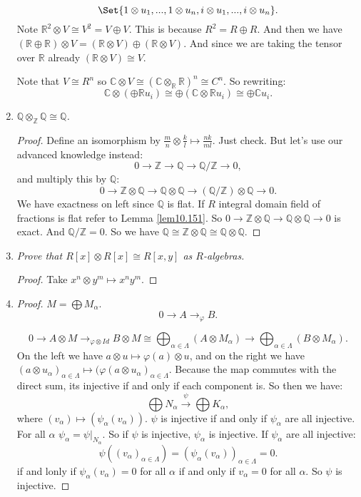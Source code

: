 \documentclass[9pt,reqno,twoside]{amsbook}
\theoremstyle{plain}
\numberwithin{section}{chapter}
\numberwithin{equation}{chapter}
\theoremstyle{definition}
\theoremstyle{remark}
\theoremstyle{plain}
\newcommand{\R}{\mathbb{R}}
\newcommand{\z}{\mathbb{Z}}
\newcommand{\Q}{\mathbb{Q}}
\renewcommand{\c}{\mathbb{C}}
\newcommand{\fracc}{\frac}
\newcommand{\tens}{\otimes}
\renewcommand{\phi}{\varphi}
\begin{document}
\begin{enumerate}[label=\arabic*.]
$$
\Set{1 \tens u_1,...,1 \tens u_n,i \tens u_1,...,i \tens u_n}.
$$ 
Note $\R^2 \tens V \cong V^2 = V \oplus V$. This is because $R^2 = R \oplus R$. And then we have $(\R \oplus \R) \tens V = (\R \tens V) \oplus (\R \tens V)$. And since we are taking the tensor over $\R$ already $(\R \tens V) \cong V$.  

Note that $V \cong R^n$ so $\c \tens V \cong (\c \tens_\R \R)^n \cong C^n$. So rewriting:
$$
\c \tens(\oplus\R u_i) \cong \oplus(\c \tens \R u_i) \cong \oplus \c u_i.
$$



\setcounter{enumi}{13}
\item \textit{$\Q \tens_\z \Q \cong \Q$. }

\begin{proof}
Define an isomorphism by $\fracc{m}{n} \tens \fracc{k}{l} \mapsto \fracc{nk}{ml}$. Just check. But let's use our advanced knowledge instead:
$$
0 \to \z \to \Q \to \Q/\z \to 0,
$$
and multiply this by $\Q$:
$$
0 \to \z \tens \Q \to \Q \tens \Q \to (\Q/\z)\tens \Q \to 0.
$$
We have exactness on left since $\Q$ is flat. If $R$ integral domain field of fractions is flat refer to Lemma \ref{lem10.151}. So $0 \to \z \tens \Q \to \Q \tens \Q \to 0$ is exact. And $\Q/\z = 0$. So we have $\Q \cong \z \tens \Q \cong \Q \tens \Q$. 
\end{proof}

\setcounter{enumi}{15}

\item \textit{Prove that $R[x] \tens R[x] \cong R[x,y]$ as $R$-algebras. }

\begin{proof}
Take $x^n \tens y^m \mapsto x^ny^m$. 
\end{proof}

\setcounter{enumi}{18}

 \item 

\begin{proof}
$M = \bigoplus M_\alpha$. 
$$
0 \to A \to_\phi B.
$$

$$
0 \to A \tens M \to_{\phi \tens Id} B \tens M \cong \bigoplus_{\alpha \in \Lambda}(A \tens M_\alpha) \to \bigoplus_{\alpha \in \Lambda}(B \tens M_\alpha).
$$
On the left we have $a \tens u \mapsto \phi(a) \tens u$, and on the right we have $(a \tens u_\alpha)_{\alpha \in \Lambda} \mapsto(\phi(a \tens u_\alpha)_{\alpha \in \Lambda}$. Because the map commutes with the direct sum, its injective if and only if each component is. So then we have:
$$
\bigoplus N_\alpha \overset{\psi}{\to} \bigoplus K_\alpha,
$$
where $(v_\alpha) \mapsto(\psi_\alpha(v_\alpha))$. $\psi$ is injective if and only if $\psi_\alpha$ are all injective. For all $\alpha$ $\psi_\alpha = \psi|_{N_\alpha}$. So if $\psi$ is injective, $\psi_\alpha$ is injective. If $\psi_\alpha$ are all injective:
$$
\psi((v_\alpha)_{\alpha \in \Lambda}) = (\psi_\alpha(v_\alpha))_{\alpha \in \Lambda} = 0.
$$
if and lonly if $\psi_\alpha(v_\alpha) = 0$ for all $\alpha$ if and only if $v_\alpha = 0$ for all $\alpha$. So $\psi$ is injective. 
\end{proof}



\end{enumerate}
\end{document}
